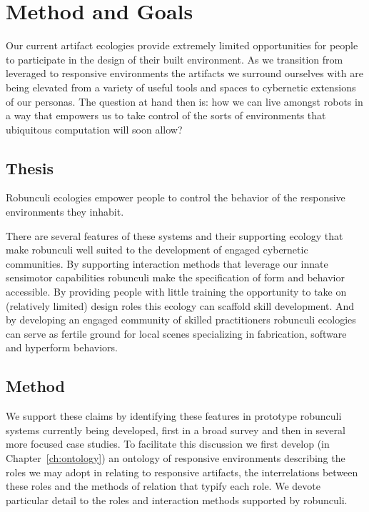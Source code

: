 \section{Method and Goals}
%
Our current artifact ecologies provide extremely limited opportunities for people to participate in the design of their built environment. 
As we transition from leveraged to responsive environments the artifacts we surround ourselves with are being elevated from a variety of useful tools and spaces to cybernetic extensions of our personas. 
The question at hand then is: how we can live amongst robots in a way that empowers us to take control of the sorts of environments that ubiquitous computation will soon allow?

\subsection{Thesis}
%
\begin{em}
Robunculi ecologies empower people to control the behavior of the responsive environments they inhabit.
\end{em}

There are several features of these systems and their supporting ecology that make robunculi well suited to the development of engaged cybernetic communities. 
By supporting interaction methods that leverage our innate sensimotor capabilities robunculi make the specification of form and behavior accessible. By providing people with little training the opportunity to take on (relatively limited) design roles this ecology can scaffold skill development. 
And by developing an engaged community of skilled practitioners robunculi ecologies can serve as fertile ground for local scenes specializing in fabrication, software and hyperform behaviors.

\subsection{Method}
%
We support these claims by identifying these features in prototype robunculi systems currently being developed, first in a broad survey and then in several more focused case studies.
To facilitate this discussion we first develop (in Chapter~\ref{ch:ontology}) an ontology of responsive environments describing the roles we may adopt in relating to responsive artifacts, the interrelations between these roles and the methods of relation that typify each role. 
We devote particular detail to the roles and interaction methods supported by robunculi.

